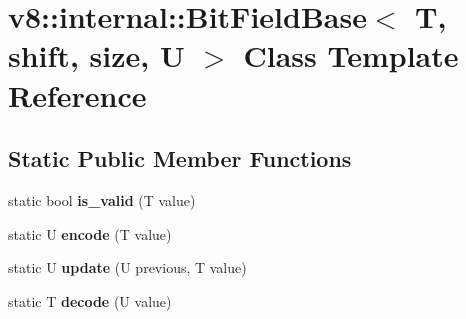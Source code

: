 \hypertarget{classv8_1_1internal_1_1_bit_field_base}{}\section{v8\+:\+:internal\+:\+:Bit\+Field\+Base$<$ T, shift, size, U $>$ Class Template Reference}
\label{classv8_1_1internal_1_1_bit_field_base}
\subsection*{Static Public Member Functions}
\begin{DoxyCompactItemize}
\item 
static bool {\bfseries is\+\_\+valid} (T value)\hypertarget{classv8_1_1internal_1_1_bit_field_base_a2bdc1abbe7bcef7acf38a7862eb1b591}{}\label{classv8_1_1internal_1_1_bit_field_base_a2bdc1abbe7bcef7acf38a7862eb1b591}

\item 
static U {\bfseries encode} (T value)\hypertarget{classv8_1_1internal_1_1_bit_field_base_aa162659173f7f724b50e31d89c0f3fa8}{}\label{classv8_1_1internal_1_1_bit_field_base_aa162659173f7f724b50e31d89c0f3fa8}

\item 
static U {\bfseries update} (U previous, T value)\hypertarget{classv8_1_1internal_1_1_bit_field_base_a0ce53f2db72ce51d96606fc0c9f353db}{}\label{classv8_1_1internal_1_1_bit_field_base_a0ce53f2db72ce51d96606fc0c9f353db}

\item 
static T {\bfseries decode} (U value)\hypertarget{classv8_1_1internal_1_1_bit_field_base_aa251f75c99718dea15a4f90ad42db161}{}\label{classv8_1_1internal_1_1_bit_field_base_aa251f75c99718dea15a4f90ad42db161}

\end{DoxyCompactItemize}
